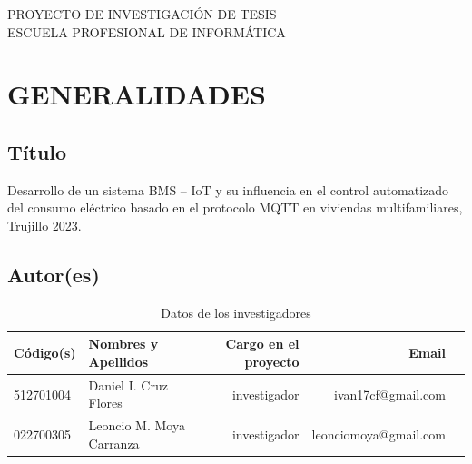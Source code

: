 \documentclass[a4paper, 12pt]{article}
\begin{document}
\begin{center}
\Large {PROYECTO DE INVESTIGACIÓN DE TESIS \\
\vskip 0.2cm
 ESCUELA PROFESIONAL DE INFORMÁTICA}
\end{center}
\vskip 1cm

\section{GENERALIDADES}



\subsection{Título}
Desarrollo de un sistema BMS – IoT y su influencia en el control automatizado del consumo eléctrico basado en el protocolo MQTT en viviendas multifamiliares, Trujillo 2023.

\subsection{Autor(es)}
\begin{table}[h!]
 \caption{\small{Datos de los investigadores}}
\begin{tabular}{llrrr} \toprule
{\bf Código(s)} & {\bf Nombres y Apellidos} & {\bf Cargo en el proyecto} & {\bf Email} \\ \midrule
512701004 & Daniel I. Cruz Flores & investigador  & ivan17cf@gmail.com \\
022700305    & Leoncio M. Moya Carranza & investigador  & leonciomoya@gmail.com            \\ \bottomrule
\end{tabular}
\end{table}
\end{document}
